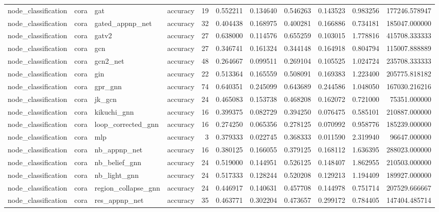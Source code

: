 \begin{tabular}{llllrrrrrrr}
node_classification & cora & gat & accuracy & 19 & 0.552211 & 0.134640 & 0.546263 & 0.143523 & 0.983256 & 177246.578947 \\
node_classification & cora & gated_appnp_net & accuracy & 32 & 0.404438 & 0.168975 & 0.400281 & 0.166886 & 0.734181 & 185047.000000 \\
node_classification & cora & gatv2 & accuracy & 27 & 0.638000 & 0.114576 & 0.655259 & 0.103015 & 1.778816 & 415708.333333 \\
node_classification & cora & gcn & accuracy & 27 & 0.346741 & 0.161324 & 0.344148 & 0.164918 & 0.804794 & 115007.888889 \\
node_classification & cora & gcn2_net & accuracy & 48 & 0.264667 & 0.099511 & 0.269104 & 0.105525 & 1.024724 & 235708.333333 \\
node_classification & cora & gin & accuracy & 22 & 0.513364 & 0.165559 & 0.508091 & 0.169383 & 1.223400 & 205775.818182 \\
node_classification & cora & gpr_gnn & accuracy & 74 & 0.640351 & 0.245099 & 0.643689 & 0.244586 & 1.048050 & 167030.216216 \\
node_classification & cora & jk_gcn & accuracy & 24 & 0.465083 & 0.153738 & 0.468208 & 0.162072 & 0.721000 & 75351.000000 \\
node_classification & cora & kikuchi_gnn & accuracy & 16 & 0.399375 & 0.082729 & 0.394250 & 0.076475 & 0.585101 & 210887.000000 \\
node_classification & cora & loop_corrected_gnn & accuracy & 16 & 0.274250 & 0.065356 & 0.278125 & 0.070992 & 0.958776 & 185239.000000 \\
node_classification & cora & mlp & accuracy & 3 & 0.379333 & 0.022745 & 0.368333 & 0.011590 & 2.319940 & 96647.000000 \\
node_classification & cora & nb_appnp_net & accuracy & 16 & 0.380125 & 0.166055 & 0.379125 & 0.168112 & 1.636395 & 288023.000000 \\
node_classification & cora & nb_belief_gnn & accuracy & 24 & 0.519000 & 0.144951 & 0.526125 & 0.148407 & 1.862955 & 210503.000000 \\
node_classification & cora & nb_light_gnn & accuracy & 24 & 0.517333 & 0.128244 & 0.520208 & 0.129213 & 1.194409 & 189927.000000 \\
node_classification & cora & region_collapse_gnn & accuracy & 24 & 0.446917 & 0.140631 & 0.457708 & 0.144978 & 0.751714 & 207529.666667 \\
node_classification & cora & res_appnp_net & accuracy & 35 & 0.463771 & 0.302204 & 0.473657 & 0.299172 & 0.784405 & 147404.485714 \\

\end{tabular}

